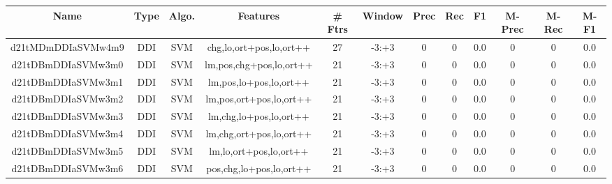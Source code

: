 \documentclass[a4paper]{article}
\begin{document}
\begin{landscape}
\begin{center}
\begin{tabular}{ |c|c|c|c|c|c|c|c|c|c|c|c|} 
 \hline
 	Name & Type & Algo. & Features & \# Ftrs & Window & Prec & Rec & F1 & M-Prec & M-Rec & M-F1\\
 \hline

 	

 
 	
 	\small{ d21tMDmDDIaSVMw4m9 } & \small{ DDI} & \small{  SVM }  & chg,lo,ort+pos,lo,ort++  &  27 &  \small{  -3:+3 }  &  0 & 0 & 0.0  &  0 & 0 & 0.0 \\
 	

 
 	
 	\small{ d21tDBmDDIaSVMw3m0 } & \small{ DDI} & \small{  SVM }  & lm,pos,chg+pos,lo,ort++  &  21 &  \small{  -3:+3 }  &  0 & 0 & 0.0  &  0 & 0 & 0.0 \\
 	

 
 	
 	\small{ d21tDBmDDIaSVMw3m1 } & \small{ DDI} & \small{  SVM }  & lm,pos,lo+pos,lo,ort++  &  21 &  \small{  -3:+3 }  &  0 & 0 & 0.0  &  0 & 0 & 0.0 \\
 	

 
 	
 	\small{ d21tDBmDDIaSVMw3m2 } & \small{ DDI} & \small{  SVM }  & lm,pos,ort+pos,lo,ort++  &  21 &  \small{  -3:+3 }  &  0 & 0 & 0.0  &  0 & 0 & 0.0 \\
 	

 
 	
 	\small{ d21tDBmDDIaSVMw3m3 } & \small{ DDI} & \small{  SVM }  & lm,chg,lo+pos,lo,ort++  &  21 &  \small{  -3:+3 }  &  0 & 0 & 0.0  &  0 & 0 & 0.0 \\
 	

 
 	
 	\small{ d21tDBmDDIaSVMw3m4 } & \small{ DDI} & \small{  SVM }  & lm,chg,ort+pos,lo,ort++  &  21 &  \small{  -3:+3 }  &  0 & 0 & 0.0  &  0 & 0 & 0.0 \\
 	

 
 	
 	\small{ d21tDBmDDIaSVMw3m5 } & \small{ DDI} & \small{  SVM }  & lm,lo,ort+pos,lo,ort++  &  21 &  \small{  -3:+3 }  &  0 & 0 & 0.0  &  0 & 0 & 0.0 \\
 	

 
 	
 	\small{ d21tDBmDDIaSVMw3m6 } & \small{ DDI} & \small{  SVM }  & pos,chg,lo+pos,lo,ort++  &  21 &  \small{  -3:+3 }  &  0 & 0 & 0.0  &  0 & 0 & 0.0 \\
 	


\end{tabular}
\end{center}
\end{landscape}
\end{document}

